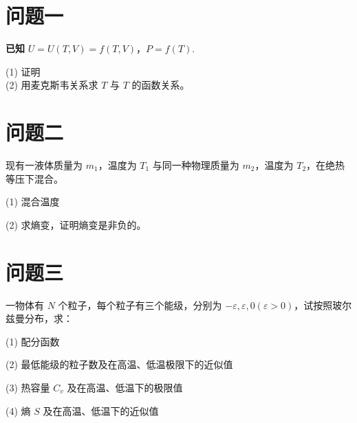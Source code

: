 



\section*{问题一}
\textbf{已知} $U = U(T, V) = f(T, V)$，$P = f(T)$.

(1) 证明
\\[\\left( \\frac{\\partial U}{\partial T} \right)_V = T \left( \frac{\partial S}{\\partial V} \\right)_T - P\\]

(2) 用麦克斯韦关系求 $T$ 与 $T$ 的函数关系。

\section*{问题二}
现有一液体质量为 $m_1$，温度为 $T_1$ 与同一种物理质量为 $m_2$，温度为 $T_2$，在绝热等压下混合。

(1) 混合温度

(2) 求熵变，证明熵变是非负的。

\section*{问题三}
一物体有 $N$ 个粒子，每个粒子有三个能级，分别为 $-\varepsilon, \varepsilon, 0 (\varepsilon > 0)$，试按照玻尔兹曼分布，求：

(1) 配分函数

(2) 最低能级的粒子数及在高温、低温极限下的近似值

(3) 热容量 $C_v$ 及在高温、低温下的极限值

(4) 熵 $S$ 及在高温、低温下的近似值

